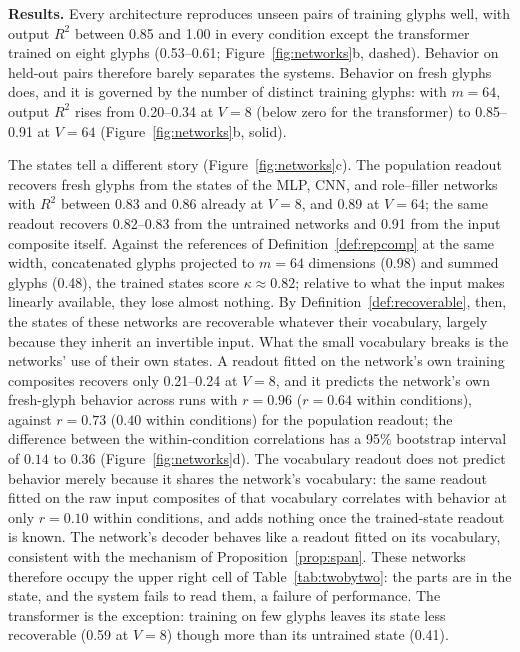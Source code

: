 \documentclass[10pt]{article}
\theoremstyle{plain}
\theoremstyle{remark}
\begin{document}
\textbf{Results.} Every architecture reproduces unseen pairs of training glyphs well, with output $R^2$ between 0.85 and 1.00 in every condition except the transformer trained on eight glyphs (0.53--0.61; Figure~\ref{fig:networks}b, dashed). Behavior on held-out pairs therefore barely separates the systems. Behavior on fresh glyphs does, and it is governed by the number of distinct training glyphs: with $m = 64$, output $R^2$ rises from 0.20--0.34 at $V = 8$ (below zero for the transformer) to 0.85--0.91 at $V = 64$ (Figure~\ref{fig:networks}b, solid).

The states tell a different story (Figure~\ref{fig:networks}c). The population readout recovers fresh glyphs from the states of the MLP, CNN, and role--filler networks with $R^2$ between 0.83 and 0.86 already at $V = 8$, and 0.89 at $V = 64$; the same readout recovers 0.82--0.83 from the untrained networks and 0.91 from the input composite itself. Against the references of Definition~\ref{def:repcomp} at the same width, concatenated glyphs projected to $m = 64$ dimensions (0.98) and summed glyphs (0.48), the trained states score $\kappa \approx 0.82$; relative to what the input makes linearly available, they lose almost nothing. By Definition~\ref{def:recoverable}, then, the states of these networks are recoverable whatever their vocabulary, largely because they inherit an invertible input. What the small vocabulary breaks is the networks' use of their own states. A readout fitted on the network's own training composites recovers only 0.21--0.24 at $V = 8$, and it predicts the network's own fresh-glyph behavior across runs with $r = 0.96$ ($r = 0.64$ within conditions), against $r = 0.73$ ($0.40$ within conditions) for the population readout; the difference between the within-condition correlations has a 95\% bootstrap interval of $0.14$ to $0.36$ (Figure~\ref{fig:networks}d). The vocabulary readout does not predict behavior merely because it shares the network's vocabulary: the same readout fitted on the raw input composites of that vocabulary correlates with behavior at only $r = 0.10$ within conditions, and adds nothing once the trained-state readout is known. The network's decoder behaves like a readout fitted on its vocabulary, consistent with the mechanism of Proposition~\ref{prop:span}. These networks therefore occupy the upper right cell of Table~\ref{tab:twobytwo}: the parts are in the state, and the system fails to read them, a failure of performance. The transformer is the exception: training on few glyphs leaves its state less recoverable (0.59 at $V = 8$) though more than its untrained state (0.41).
\end{document}
